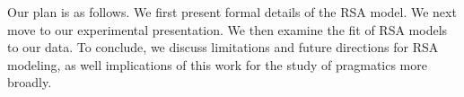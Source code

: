 Our plan is as follows. We first present formal details of the RSA model. We next move to our experimental presentation. We then examine the fit of RSA models to our data. To conclude, we discuss limitations and future directions for RSA modeling, as well implications of this work for the study of pragmatics more broadly. 


